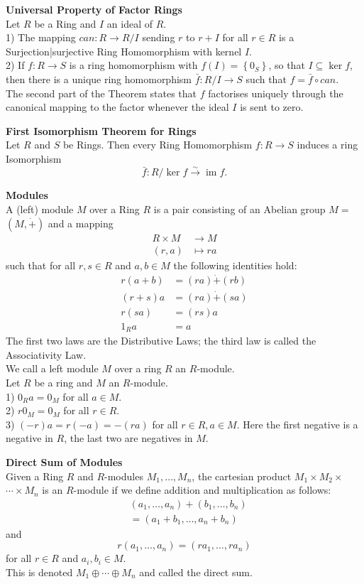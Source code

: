 \documentclass[a4paper, 10pt]{article}
\begin{document}
\begin{multicols*}{3}
\textbf{Universal Property of Factor Rings}\\
Let $R$ be a Ring and $I$ an ideal of $R$.\\
1) The mapping $can : R \rightarrow R / I$ sending $r$ to $r+I$ for all $r \in R$ is a Surjection|surjective Ring Homomorphism with kernel $I$.\\
2) If $f: R \rightarrow S$ is a ring homomorphism with $f(I)=\left\{0_S\right\}$, so that $I \subseteq \operatorname{ker} f$, then there is a unique ring homomorphism $\bar{f}: R / I \rightarrow S$ such that $f=\bar{f} \circ can$.\\
The second part of the Theorem states that $f$ factorises uniquely through the canonical mapping to the factor whenever the ideal $I$ is sent to zero.

\textbf{First Isomorphism Theorem for Rings}\\
Let $R$ and $S$ be Rings. Then every Ring Homomorphism $f: R \longrightarrow S$ induces a ring Isomorphism
$$
\bar{f}: R / \operatorname{ker} f \xrightarrow{\sim} \operatorname{im} f .
$$

\textbf{Modules}\\
A (left) module $M$ over a Ring $R$ is a pair consisting of an Abelian group $M=$ $(M, \dot{+})$ and a mapping
\begin{align*}
R \times M & \rightarrow M \\
(r, a) & \mapsto r a
\end{align*}
such that for all $r, s \in R$ and $a, b \in M$ the following identities hold:
\begin{align*}
r(a+b) & =(r a) \dot{+}(r b) \\
(r+s) a & =(r a) \dot{+}(s a) \\
r(s a) & =(r s) a \\
1_R a & =a
\end{align*}
The first two laws are the Distributive Laws; the third law is called the Associativity Law. \\
We call a left module $M$ over a ring $R$ an $R$-module.\\
Let $R$ be a ring and $M$ an $R$-module.\\
1) $0_R a=0_M$ for all $a \in M$.\\
2) $r 0_M=0_M$ for all $r \in R$.\\
3) $(-r) a=r(-a)=-(r a)$ for all $r \in R, a \in M$. Here the first negative is a negative in $R$, the last two are negatives in $M$.

\textbf{Direct Sum of Modules}\\
Given a Ring $R$ and $R$-modules $M_1, \ldots, M_n$, the cartesian product $M_1 \times M_2 \times$ $\cdots \times M_n$ is an $R$-module if we define addition and multiplication as follows:
\begin{align*}
&\left(a_1, \ldots, a_n\right)+\left(b_1, \ldots, b_n\right)\\
&=\left(a_1+b_1, \ldots, a_n+b_n\right)
\end{align*}
and
$$
r\left(a_1, \ldots, a_n\right)=\left(r a_1, \ldots, r a_n\right)
$$
for all $r \in R$ and $a_i, b_i \in M$. \\
This is denoted $M_1 \oplus \cdots \oplus M_n$ and called the direct sum. 


\end{multicols*}
\end{document}

